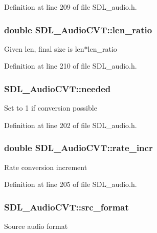 Definition at line 209 of file S\-D\-L\-\_\-audio.\-h.

\hypertarget{struct_s_d_l___audio_c_v_t_a5628ff5ccf711de9d77c0a4a9f57d2f0}{
\subsubsection[{len\-\_\-ratio}]{\setlength{\rightskip}{0pt plus 5cm}double S\-D\-L\-\_\-\-Audio\-C\-V\-T\-::len\-\_\-ratio}}\label{struct_s_d_l___audio_c_v_t_a5628ff5ccf711de9d77c0a4a9f57d2f0}
Given len, final size is len$\ast$len\-\_\-ratio 

Definition at line 210 of file S\-D\-L\-\_\-audio.\-h.

\hypertarget{struct_s_d_l___audio_c_v_t_ac600a035a48df05e14d3712fd6953ad4}{
\subsubsection[{needed}]{ S\-D\-L\-\_\-\-Audio\-C\-V\-T\-::needed}}\label{struct_s_d_l___audio_c_v_t_ac600a035a48df05e14d3712fd6953ad4}
Set to 1 if conversion possible 

Definition at line 202 of file S\-D\-L\-\_\-audio.\-h.

\hypertarget{struct_s_d_l___audio_c_v_t_ad886122c23a6673073baace31bff3b6c}{
\subsubsection[{rate\-\_\-incr}]{\setlength{\rightskip}{0pt plus 5cm}double S\-D\-L\-\_\-\-Audio\-C\-V\-T\-::rate\-\_\-incr}}\label{struct_s_d_l___audio_c_v_t_ad886122c23a6673073baace31bff3b6c}
Rate conversion increment 

Definition at line 205 of file S\-D\-L\-\_\-audio.\-h.

\hypertarget{struct_s_d_l___audio_c_v_t_a6ae81231e017105e6d5e745a51732e16}{
\subsubsection[{src\-\_\-format}]{ S\-D\-L\-\_\-\-Audio\-C\-V\-T\-::src\-\_\-format}}\label{struct_s_d_l___audio_c_v_t_a6ae81231e017105e6d5e745a51732e16}
Source audio format 

